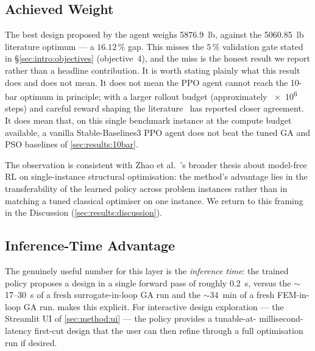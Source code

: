 \subsection{Achieved Weight}
\label{sec:results:rl:weight}

The best design proposed by the agent weighs \num{5876.9}~lb,
against the \num{5060.85}~lb literature optimum --- a
$\num{16.12}\,\%$ gap. This misses the $\num{5}\,\%$ validation
gate stated in \S\ref{sec:intro:objectives} (objective~4), and
the miss is the honest result we report rather than a headline
contribution. It is worth stating plainly what this result does
and does not mean. It does not mean the PPO agent cannot reach
the 10-bar optimum in principle; with a larger rollout budget
(approximately \num{e6} steps) and careful reward shaping the
literature~\cite{hayashi2020rl} has reported closer agreement.
It does mean that, on this single benchmark instance at the
compute budget available, a vanilla Stable-Baselines3 PPO agent
does not beat the tuned GA and PSO baselines of
\cref{sec:results:10bar}.

The observation is consistent with Zhao et
al.~\cite{zhao2021rl}'s broader thesis about model-free RL on
single-instance structural optimisation: the method's advantage
lies in the transferability of the learned policy across
problem instances rather than in matching a tuned classical
optimiser on one instance. We return to this framing in the
Discussion (\cref{sec:results:discussion}).

\subsection{Inference-Time Advantage}
\label{sec:results:rl:inference}

The genuinely useful number for this layer is the
\emph{inference time}: the trained policy proposes a design in a
single forward pass of roughly \num{0.2}~s, versus the
$\sim$\num{17}--\num{30}~s of a fresh surrogate-in-loop GA run and
the $\sim$\num{34}~min of a fresh FEM-in-loop GA run.
 makes this explicit. For
interactive design exploration --- the Streamlit UI of
\cref{sec:method:ui} --- the policy provides a tunable-at-
millisecond-latency first-cut design that the user can then
refine through a full optimisation run if desired.


